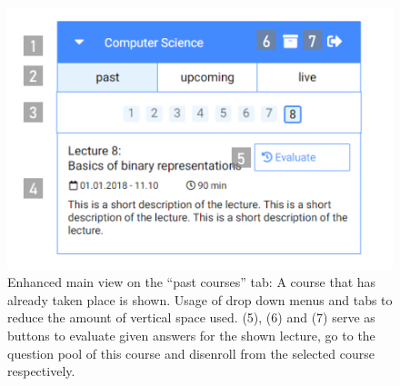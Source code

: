 \begin{figure}[ht]
	\centering
	\includegraphics[width=\textwidth]{mockups/main_view_enhancement_v1_annotated.png}
	\caption{Enhanced main view on the “past courses” tab:
		A course that has already taken place is shown.
		Usage of drop down menus and tabs to reduce the amount of vertical space used. (5), (6) and (7) serve as buttons to evaluate given answers for the shown lecture, go to the question pool of this course and disenroll from the selected course respectively.
	}
	\label{figure:mainviewenhancement}
\end{figure}
